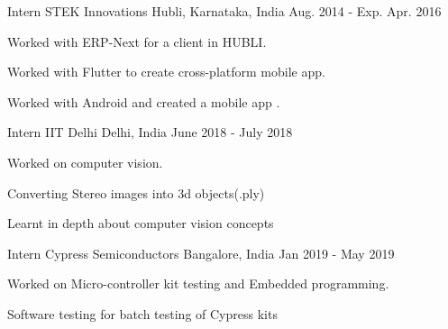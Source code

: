 


\begin{cventries}


\cventry
{Intern} %
{STEK Innovations} %
{Hubli, Karnataka, India} %
{Aug. 2014 - Exp. Apr. 2016} %
{ %
\begin{cvitems}
\item {Worked with ERP-Next for a client in HUBLI.}
\item {Worked with Flutter to create cross-platform mobile app.}
\item {Worked with Android and created a mobile app .}
\end{cvitems}
}
\cventry
{Intern} %
{IIT Delhi} %
{Delhi, India} %
{June 2018 - July 2018} %
{ %
\begin{cvitems}
\item {Worked on computer vision.}
\item {Converting Stereo images into 3d objects(.ply)}
\item{Learnt in depth about computer vision concepts}
\end{cvitems}
}

\cventry
{Intern} %
{Cypress Semiconductors} %
{Bangalore, India} %
{Jan 2019 - May 2019} %
{ %
\begin{cvitems}
\item {Worked on Micro-controller kit testing and Embedded programming.}
\item {Software testing for batch testing of Cypress kits}
\end{cvitems}
}





\end{cventries}